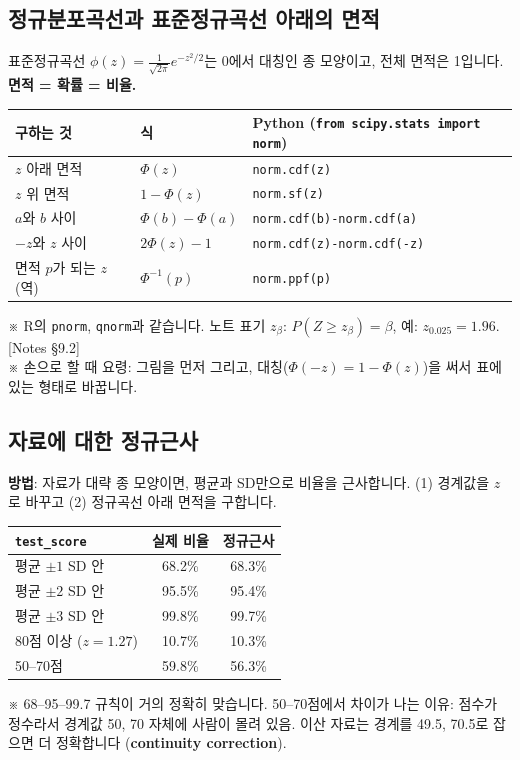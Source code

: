 \documentclass[11pt,a4paper]{article}
\newcommand{\term}[1]{\textbf{#1}}
\newcommand{\code}[1]{\texttt{#1}}
\newcommand{\nref}[1]{{\footnotesize\textsf{\color{blue!55!black}[Notes #1]}}}
\newcommand{\aside}[1]{{\footnotesize\color{black!65}#1}}
\begin{document}
\subsection{정규분포곡선과 표준정규곡선 아래의 면적}
표준정규곡선 $\phi(z)=\frac1{\sqrt{2\pi}}e^{-z^2/2}$는 0에서 대칭인 종 모양이고, 전체 면적은 1입니다. \textbf{면적 = 확률 = 비율.}
\begin{center}
\begin{tabular}{@{}l l l@{}}
\toprule
구하는 것 & 식 & Python (\code{from scipy.stats import norm}) \\
\midrule
$z$ 아래 면적 & $\Phi(z)$ & \code{norm.cdf(z)} \\
$z$ 위 면적 & $1-\Phi(z)$ & \code{norm.sf(z)} \\
$a$와 $b$ 사이 & $\Phi(b)-\Phi(a)$ & \code{norm.cdf(b)-norm.cdf(a)} \\
$-z$와 $z$ 사이 & $2\Phi(z)-1$ & \code{norm.cdf(z)-norm.cdf(-z)} \\
면적 $p$가 되는 $z$ (역) & $\Phi^{-1}(p)$ & \code{norm.ppf(p)} \\
\bottomrule
\end{tabular}
\end{center}
\aside{※ R의 \code{pnorm}, \code{qnorm}과 같습니다. 노트 표기 $z_\beta$: $P(Z\ge z_\beta)=\beta$, 예: $z_{0.025}=1.96$. \nref{§9.2}}\\
\aside{※ 손으로 할 때 요령: 그림을 먼저 그리고, 대칭($\Phi(-z)=1-\Phi(z)$)을 써서 표에 있는 형태로 바꿉니다.}

\subsection{자료에 대한 정규근사}
\textbf{방법}: 자료가 대략 종 모양이면, 평균과 SD만으로 비율을 근사합니다. (1) 경계값을 $z$로 바꾸고 (2) 정규곡선 아래 면적을 구합니다.

\begin{center}
\begin{tabular}{@{}l c c@{}}
\toprule
\code{test\_score} & 실제 비율 & 정규근사 \\
\midrule
평균 $\pm1$ SD 안 & 68.2\% & 68.3\% \\
평균 $\pm2$ SD 안 & 95.5\% & 95.4\% \\
평균 $\pm3$ SD 안 & 99.8\% & 99.7\% \\
80점 이상 ($z=1.27$) & 10.7\% & 10.3\% \\
50–70점 & 59.8\% & 56.3\% \\
\bottomrule
\end{tabular}
\end{center}
\aside{※ 68–95–99.7 규칙이 거의 정확히 맞습니다. 50–70점에서 차이가 나는 이유: 점수가 정수라서 경계값 50, 70 자체에 사람이 몰려 있음. 이산 자료는 경계를 49.5, 70.5로 잡으면 더 정확합니다 (\term{continuity correction}).}
\end{document}
